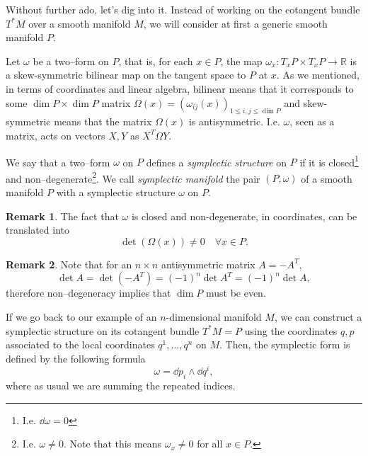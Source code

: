 \documentclass[english,fontsize=11pt,paper=b5]{scrbook}
\numberwithin{equation}{chapter}
\theoremstyle{definition}
\newtheorem{remark}{Remark}[chapter]
\begin{document}
    Without further ado, let's dig into it. Instead of working on the cotangent bundle $T^*M$ over a smooth manifold $M$, we will consider at first a generic smooth manifold $P$.

    Let $\omega$ be a two--form on $P$, that is, for each $x\in P$, the map $\omega_x: T_x P \times T_x P \to \mathbb{R}$ is a skew-symmetric bilinear map on the tangent space to $P$ at $x$. As we mentioned, in terms of coordinates and linear algebra, bilinear means that it corresponds to some $\dim P\times \dim P$ matrix $\Omega(x) = \left(\omega_{ij}(x)\right)_{1\leq i,j\leq \dim P}$ and skew-symmetric means that the matrix $\Omega(x)$ is antisymmetric. I.e. $\omega$, seen as a matrix, acts on vectors $X,Y$ as $X^T \Omega Y$.

    \begin{tcolorbox}
      We say that a two--form $\omega$ on $P$ defines a \emph{symplectic structure} on $P$ if it is closed\footnote{I.e. $\dd\omega = 0$}
      and non--degenerate\footnote{I.e. $\omega \neq 0$. Note that this means $\omega_x \neq 0$ for all $x \in P$.}.
      We call \emph{symplectic manifold} the pair $(P, \omega)$ of a smooth manifold $P$ with a symplectic structure $\omega$ on $P$.
    \end{tcolorbox}

    \begin{remark}
      The fact that $\omega$ is closed and non-degenerate, in coordinates, can be translated into
      \begin{equation}
        \det (\Omega(x)) \neq 0 \quad \forall x\in P.
      \end{equation}
    \end{remark}

    \begin{remark}
      Note that for an $n\times n$ antisymmetric matrix $A = - A^T$,
      \begin{equation}
        \det A = \det (-A^T) = (-1)^n \det A^T =  (-1)^n \det A,
      \end{equation}
      therefore non--degeneracy implies that $\dim P$ must be even.
    \end{remark}

    If we go back to our example of an $n$-dimensional manifold $M$, we can construct a symplectic structure on its cotangent bundle $T^*M = P$ using the coordinates $q,p$ associated to the local coordinates $q^1, \ldots, q^n$ on $M$.
    Then, the symplectic form is defined by the following formula
    \begin{equation}\label{eq:canonical2form}
      \omega = \dd p_i \wedge \dd q^i,
    \end{equation}
    where as usual we are summing the repeated indices.
\end{document}

